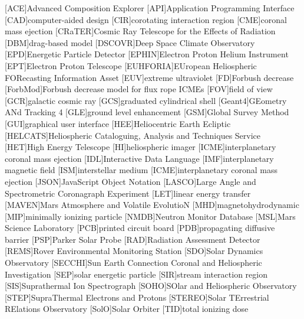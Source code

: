 	\begin{acronym}\itemsep0pt
	[ACE]{Advanced Composition Explorer}
	[API]{Application Programming Interface}
	[CAD]{computer-aided design}
	[CIR]{corotating interaction region}
	[CME]{coronal mass ejection}
	[CRaTER]{Cosmic Ray Telescope for the Effects of Radiation}
	[DBM]{drag-based model}
	[DSCOVR]{Deep Space Climate Observatory}
	[EPD]{Energetic Particle Detector}
	[EPHIN]{Electron Proton Helium Instrument}
	[EPT]{Electron Proton Telescope}
    [EUHFORIA]{EUropean Heliospheric FORecasting Information Asset}
	[EUV]{extreme ultraviolet}
	[FD]{Forbush decrease}
	[ForbMod]{Forbush decrease model for flux rope ICMEs}
	[FOV]{field of view}
	[GCR]{galactic cosmic ray}
	[GCS]{graduated cylindrical shell}
	[Geant4]{GEometry ANd Tracking 4}
	[GLE]{ground level enhancement}
	[GSM]{Global Survey Method}
	[GUI]{graphical user interface}
	[HEE]{Heliocentric Earth Ecliptic}
	[HELCATS]{Heliospheric Cataloguing, Analysis and Techniques Service}
	[HET]{High Energy Telescope}
	[HI]{heliospheric imager}
	[ICME]{interplanetary coronal mass ejection}
	[IDL]{Interactive Data Language}
	[IMF]{interplanetary magnetic field}
    [ISM]{interstellar medium}
	[ICME]{interplanetary coronal mass ejection}
	[JSON]{JavaScript Object Notation}
    [LASCO]{Large Angle and Spectrometric Coronagraph Experiment}
	[LET]{linear energy transfer}
	[MAVEN]{Mars Atmosphere and Volatile EvolutioN}
	[MHD]{magnetohydrodynamic}
	[MIP]{minimally ionizing particle}
	[NMDB]{Neutron Monitor Database}
	[MSL]{Mars Science Laboratory}
	[PCB]{printed circuit board}
	[PDB]{propagating diffusive barrier}
	[PSP]{Parker Solar Probe}
	[RAD]{Radiation Assessment Detector}
	[REMS]{Rover Environmental Monitoring Station}
	[SDO]{Solar Dynamics Observatory}
    [SECCHI]{Sun Earth Connection Coronal and Heliospheric Investigation}
	[SEP]{solar energetic particle}
	[SIR]{stream interaction region}
	[SIS]{Suprathermal Ion Spectrograph}
	[SOHO]{SOlar and Heliospheric Observatory}
	[STEP]{SupraThermal Electrons and Protons}
	[STEREO]{Solar TErrestrial RElations Observatory}
	[SolO]{Solar Orbiter}
	[TID]{total ionizing dose}
	\end{acronym}
	

\endgroup

\cleardoublepage